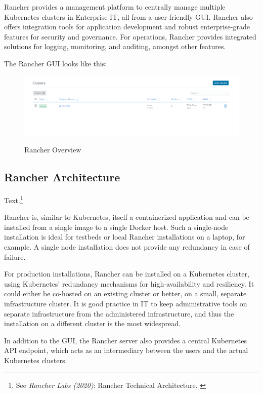 Rancher provides a management platform to centrally manage multiple Kubernetes clusters in Enterprise IT, all from a user-friendly GUI. Rancher also offers integration tools for application development and robust enterprise-grade features for security and governance. For operations, Rancher provides integrated solutions for logging, monitoring, and auditing, amongst other features.

The Rancher GUI looks like this:

\begin{figure}[H]
\centering
\caption {Rancher Overview}
\includegraphics[width=\linewidth]{images/cluster-overview.png}
\label{fig:rancherOverview}
\end{figure}

\subsection{Rancher Architecture}

Text.\footnote{See \textit{Rancher Labs (2020)}: Rancher Technical Architecture. \cite{technicalArchitecture}}

Rancher is, similar to Kubernetes, itself a containerized application and can be installed from a single image to a single Docker host. Such a single-node installation is ideal for testbeds or local Rancher installations on a laptop, for example. A single node installation does not provide any redundancy in case of failure.

For production installations, Rancher can be installed on a Kubernetes cluster, using Kubernetes' redundancy mechanisms for high-availability and resiliency. It could either be co-hosted on an existing cluster or better, on a small, separate infrastructure cluster. It is good practice in IT to keep administrative tools on separate infrastructure from the administered infrastructure, and thus the installation on a different cluster is the most widespread.

In addition to the GUI, the Rancher server also provides a central Kubernetes API endpoint, which acts as an intermediary between the users and the actual Kubernetes clusters.

